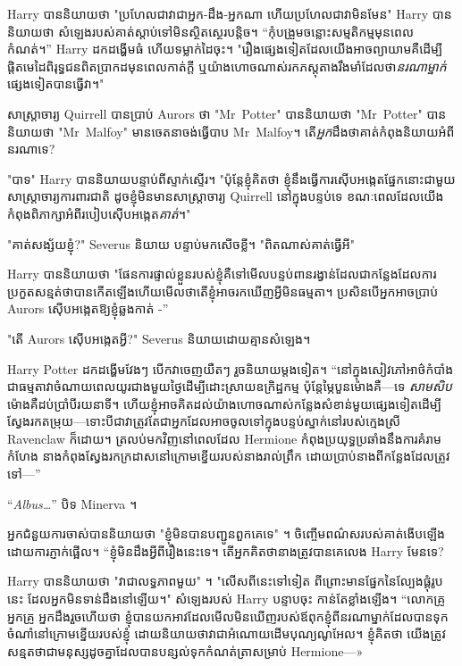 {{{Harry បាននិយាយថា "ប្រហែលជាវាជាអ្នក-ដឹង-អ្នកណា ហើយប្រហែលជាវាមិនមែន" Harry បាននិយាយថា សំឡេងរបស់គាត់ស្តាប់ទៅមិនស្ថិតស្ថេរបន្តិច។ “កុំ​បង្រួម​ចន្លោះ​សម្មតិកម្ម​មុន​ពេល​កំណត់។” Harry ដកដង្ហើមធំ ហើយទម្លាក់ដៃចុះ។ "រឿងផ្សេងទៀតដែលយើងអាចព្យាយាមគឺដើម្បីផ្ដិតមេដៃពិរុទ្ធជនពិតប្រាកដមុនពេលកាត់ក្តី ឬយ៉ាងហោចណាស់រកភស្តុតាងរឹងមាំដែលថា\emph{នរណាម្នាក់}ផ្សេងទៀតបានធ្វើវា។"

សាស្ត្រាចារ្យ Quirrell បានប្រាប់ Aurors ថា "Mr~Potter" បាននិយាយថា "Mr~Potter" បាននិយាយថា "Mr~Malfoy" មានចេតនាចង់ធ្វើបាប Mr~Malfoy។ តើ\emph{អ្នក}ដឹងថាគាត់កំពុងនិយាយអំពីនរណាទេ?

"បាទ" Harry បាននិយាយបន្ទាប់ពីស្ទាក់ស្ទើរ។ "ប៉ុន្តែខ្ញុំគិតថា ខ្ញុំនឹងធ្វើការស៊ើបអង្កេតផ្នែកនោះជាមួយសាស្រ្តាចារ្យការពារជាតិ ដូចខ្ញុំមិនមានសាស្ត្រាចារ្យ Quirrell នៅក្នុងបន្ទប់ទេ ខណៈពេលដែលយើងកំពុងពិភាក្សាអំពីរបៀបស៊ើបអង្កេត\emph{គាត់}។"

"គាត់សង្ស័យខ្ញុំ?" Severus និយាយ បន្ទាប់មកសើចខ្លី។ "ពិតណាស់គាត់ធ្វើអី"

Harry បាននិយាយថា "ផែនការផ្ទាល់ខ្លួនរបស់ខ្ញុំគឺទៅមើលបន្ទប់ពានរង្វាន់ដែលជាកន្លែងដែលការប្រកួតសន្មត់ថាបានកើតឡើងហើយមើលថាតើខ្ញុំអាចរកឃើញអ្វីមិនធម្មតា។ ប្រសិនបើអ្នកអាចប្រាប់ Aurors ស៊ើបអង្កេតឱ្យខ្ញុំឆ្លងកាត់ -”

"តើ Aurors ស៊ើបអង្កេតអ្វី?" Severus និយាយ​ដោយ​គ្មាន​សំឡេង។

Harry Potter ដកដង្ហើមវែងៗ បើកវាចេញយឺតៗ រួចនិយាយម្តងទៀត។ “នៅក្នុងសៀវភៅអាថ៌កំបាំង ជាធម្មតាវាចំណាយពេលយូរជាងមួយថ្ងៃដើម្បីដោះស្រាយឧក្រិដ្ឋកម្ម ប៉ុន្តែម្ភៃបួនម៉ោងគឺ—ទេ \emph{សាមសិប} ម៉ោងគឺដប់ប្រាំបីរយនាទី។ ហើយ​ខ្ញុំ​អាច​គិត​ដល់​យ៉ាងហោចណាស់​កន្លែង​សំខាន់​មួយ​ផ្សេងទៀត​ដើម្បី​ស្វែងរក​តម្រុយ—ទោះបីជា​វា​ត្រូវតែ​ជា​អ្នក​ដែល​អាច​ចូល​ទៅ​ក្នុង​បន្ទប់​ស្នាក់នៅ​របស់​ក្មេងស្រី Ravenclaw ក៏ដោយ។ ត្រលប់មកវិញនៅពេលដែល Hermione កំពុងប្រយុទ្ធប្រឆាំងនឹងការគំរាមកំហែង នាងកំពុងស្វែងរកក្រដាសនៅក្រោមខ្នើយរបស់នាងរាល់ព្រឹក ដោយប្រាប់នាងពីកន្លែងដែលត្រូវទៅ—”

“\emph{Albus…}” បិទ Minerva ។

អ្នកជំនួយការចាស់បាននិយាយថា "ខ្ញុំមិនបានបញ្ជូនពួកគេទេ" ។ ចិញ្ចើម​ពណ៌​ស​របស់​គាត់​ងើប​ឡើង​ដោយ​ការ​ភ្ញាក់​ផ្អើល។ “ខ្ញុំ​មិន​ដឹង​អ្វី​ពី​រឿង​នេះ​ទេ។ តើអ្នកគិតថានាងត្រូវបានគេលេង Harry មែនទេ?

Harry បាននិយាយថា "វាជាលទ្ធភាពមួយ" ។ "លើសពីនេះទៅទៀត ពីព្រោះមានផ្នែកនៃល្បែងផ្គុំរូបនេះ ដែលអ្នកមិនទាន់ដឹងនៅឡើយ។" សំឡេងរបស់ Harry បន្ទាបចុះ កាន់តែខ្លាំងឡើង។ “លោកគ្រូ អ្នកគ្រូ អ្នកដឹងរួចហើយថា ខ្ញុំបានយកអាវដែលមើលមិនឃើញរបស់ឪពុកខ្ញុំពីនរណាម្នាក់ដែលបានទុកចំណាំនៅក្រោមខ្នើយរបស់ខ្ញុំ ដោយនិយាយថាវាជាអំណោយដើមបុណ្យណូអែល។ ខ្ញុំ​គិត​ថា យើង​ត្រូវ​សន្មត​ថា​ជា​មនុស្ស​ដូចគ្នា​ដែល​បាន​បន្សល់​ទុក​កំណត់​ត្រា​សម្រាប់ Hermione—»

}}}
